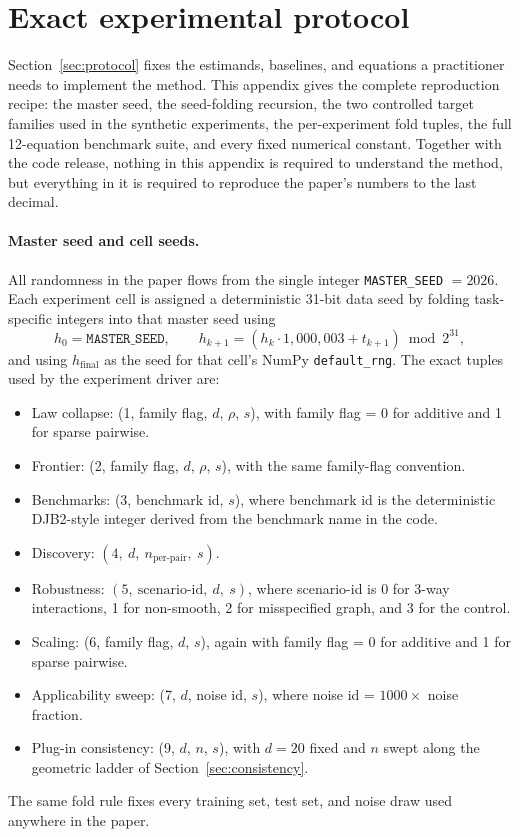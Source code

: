 \documentclass{article}
\begin{document}
\section{Exact experimental protocol}
\label{app:exact_repro}

Section~\ref{sec:protocol} fixes the estimands, baselines, and equations a practitioner needs to implement the method. This appendix gives the complete reproduction recipe: the master seed, the seed-folding recursion, the two controlled target families used in the synthetic experiments, the per-experiment fold tuples, the full 12-equation benchmark suite, and every fixed numerical constant. Together with the code release, nothing in this appendix is required to understand the method, but everything in it is required to reproduce the paper's numbers to the last decimal.

\paragraph{Master seed and cell seeds.}
All randomness in the paper flows from the single integer \texttt{MASTER\_SEED} $= 2026$. Each experiment cell is assigned a deterministic 31-bit data seed by folding task-specific integers into that master seed using
\begin{equation*}
    h_0 = \texttt{MASTER\_SEED}, \qquad h_{k+1} = (h_k \cdot 1{,}000{,}003 + t_{k+1}) \bmod 2^{31},
\end{equation*}
and using $h_{\text{final}}$ as the seed for that cell's NumPy \texttt{default\_rng}. The exact tuples used by the experiment driver are:
\begin{itemize}
    \item Law collapse: (1, family flag, $d$, $\rho$, $s$), with family flag = 0 for additive and 1 for sparse pairwise.
    \item Frontier: (2, family flag, $d$, $\rho$, $s$), with the same family-flag convention.
    \item Benchmarks: (3, benchmark id, $s$), where benchmark id is the deterministic DJB2-style integer derived from the benchmark name in the code.
    \item Discovery: $(4,\ d,\ n_{\text{per-pair}},\ s)$.
    \item Robustness: $(5,\ \text{scenario-id},\ d,\ s)$, where scenario-id is 0 for 3-way interactions, 1 for non-smooth, 2 for misspecified graph, and 3 for the control.
    \item Scaling: (6, family flag, $d$, $s$), again with family flag = 0 for additive and 1 for sparse pairwise.
    \item Applicability sweep: (7, $d$, noise id, $s$), where noise id = $1000\times$ noise fraction.
    \item Plug-in consistency: (9, $d$, $n$, $s$), with $d = 20$ fixed and $n$ swept along the geometric ladder of Section~\ref{sec:consistency}.
\end{itemize}
\noindent The same fold rule fixes every training set, test set, and noise draw used anywhere in the paper.
\end{document}
